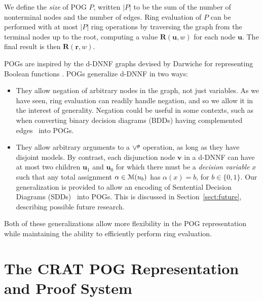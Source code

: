 \documentclass[letterpaper,USenglish,cleveref, autoref, thm-restate]{lipics-v2021}
\newcommand{\por}{\mathbin{\lor^{\sf p}}}
\newcommand{\rep}{\textbf{R}}
\newcommand{\assign}{\alpha}
\newcommand{\modelset}{{\cal M}}
\newcommand{\makenode}[1]{\mathbf{#1}}
\newcommand{\nodeu}{\makenode{u}}
\newcommand{\nodev}{\makenode{v}}
\newcommand{\noder}{\makenode{r}}
\begin{document}
We define the {\em size} of POG $P$, written $|P|$ to be the sum of
the number of nonterminal nodes and the number of edges.  Ring
evaluation of $P$ can be performed with at most $|P|$ ring
operations by traversing the graph from the terminal nodes up to
the root, computing a value $\rep(\nodeu, w)$ for each node $\nodeu$.
The final result is then $\rep(\noder, w)$.

POGs are inspired by the d-DNNF graphs devised by Darwiche for
representing Boolean functions \cite{darwiche:jair:2002}.
POGs generalize d-DNNF in two ways:
\begin{itemize}
\item They allow negation of arbitrary nodes in the graph, not just
  variables.  As we have seen, ring evaluation can readily handle negation, and so we allow it in the interest of generality.
  Negation could be useful in some contexts, such as when
  converting binary decision diagrams (BDDs) having complemented
  edges~\cite{brace-dac-1990,minato-dac-1990} into POGs.

\item They allow arbitrary arguments to a $\por$ operation, as long as
  they have disjoint models.  By contrast, each
  disjunction node $\nodev$ in a d-DNNF can have at most two children $\nodeu_1$ and $\nodeu_0$ for which there must be a {\em decision variable} $x$ such that
  any total assignment $\assign \in  \modelset(u_b)$ has $\assign(x)=b$, for $b \in \{0,1\}$.
Our generalization is provided to allow an
  encoding of Sentential Decision Diagrams (SDDs)~\cite{darwiche:ijcai:2011} into
  POGs.  This is discussed in Section~\ref{sect:future}, describing possible future research.
\end{itemize}
  Both of these generalizations allow more flexibility in the POG
  representation while maintaining the ability to efficiently perform ring evaluation.


\section{The CRAT POG Representation and Proof System}
\end{document}
